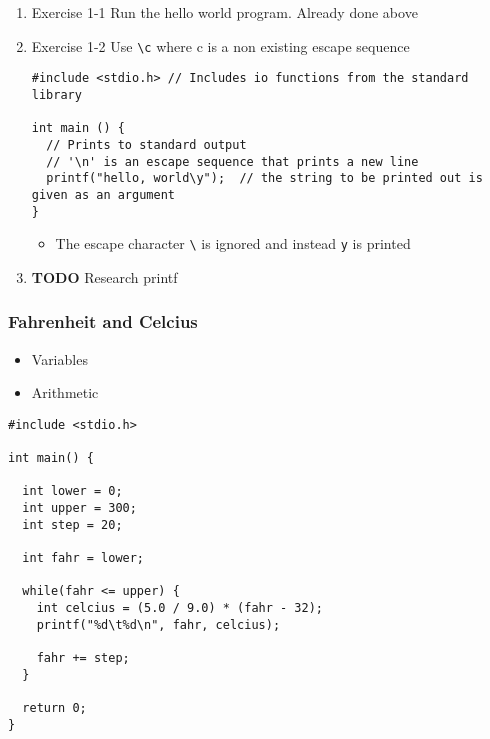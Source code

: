 \documentclass[11pt]{article}
\begin{document}
\begin{enumerate}
\item Exercise 1-1
\label{sec-1-1-1-1}
Run the hello world program. Already done above

\item Exercise 1-2
\label{sec-1-1-1-2}
Use \texttt{\textbackslash{}c} where c is a non existing escape sequence

\begin{verbatim}
#include <stdio.h> // Includes io functions from the standard library

int main () {
  // Prints to standard output
  // '\n' is an escape sequence that prints a new line
  printf("hello, world\y");  // the string to be printed out is given as an argument
}
\end{verbatim}

\begin{itemize}
\item The escape character \texttt{\textbackslash{}} is ignored and instead \texttt{y} is printed
\end{itemize}

\item {\bfseries\sffamily TODO} Research printf
\label{sec-1-1-1-3}
\end{enumerate}


\subsubsection{Fahrenheit and Celcius}
\label{sec-1-1-2}
\begin{itemize}
\item Variables
\item Arithmetic
\end{itemize}

\begin{verbatim}
#include <stdio.h>

int main() {

  int lower = 0;
  int upper = 300;
  int step = 20;

  int fahr = lower;

  while(fahr <= upper) {
    int celcius = (5.0 / 9.0) * (fahr - 32);
    printf("%d\t%d\n", fahr, celcius);

    fahr += step;
  }

  return 0;
}
\end{verbatim}
\end{document}
